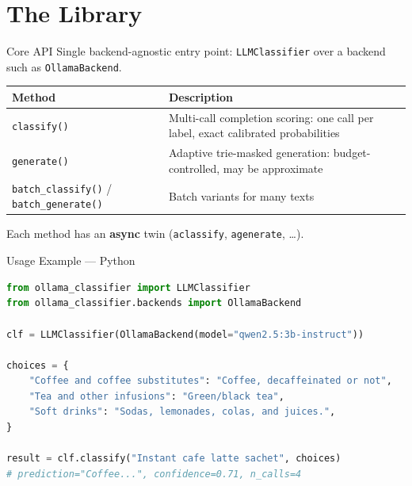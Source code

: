 \documentclass[aspectratio=169,11pt]{beamer}
\begin{document}
\section{The Library}

\begin{frame}{Core API}
  Single backend-agnostic entry point: \texttt{LLMClassifier} over a backend
  such as \texttt{OllamaBackend}.

  \vspace{0.5em}
  \centering
  \small
  \begin{tabular}{lp{7cm}}
    \toprule
    \textbf{Method} & \textbf{Description} \\
    \midrule
    \texttt{classify()} & Multi-call completion scoring: one call per label,
                          exact calibrated probabilities \\
    \texttt{generate()} & Adaptive trie-masked generation: budget-controlled,
                          may be approximate \\
    \texttt{batch\_classify()} / \texttt{batch\_generate()} & Batch variants
                          for many texts \\
    \bottomrule
  \end{tabular}

  \vspace{0.5em}
  \normalsize
  Each method has an \textbf{async} twin (\texttt{aclassify},
  \texttt{agenerate}, \dots).
\end{frame}

\begin{frame}[fragile]{Usage Example — Python}
\begin{lstlisting}[language=Python]
from ollama_classifier import LLMClassifier
from ollama_classifier.backends import OllamaBackend

clf = LLMClassifier(OllamaBackend(model="qwen2.5:3b-instruct"))

choices = {
    "Coffee and coffee substitutes": "Coffee, decaffeinated or not",
    "Tea and other infusions": "Green/black tea",
    "Soft drinks": "Sodas, lemonades, colas, and juices.",
}

result = clf.classify("Instant cafe latte sachet", choices)
# prediction="Coffee...", confidence=0.71, n_calls=4
\end{lstlisting}
\end{frame}
\end{document}

